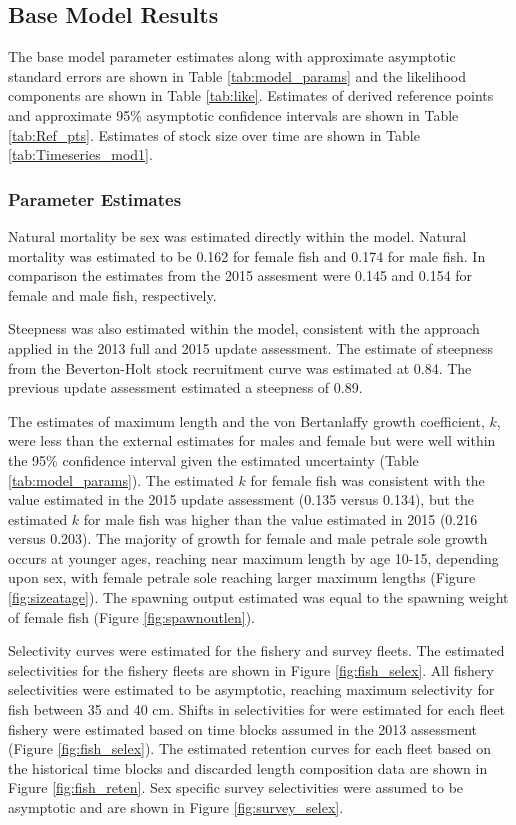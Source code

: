 \documentclass[12pt,]{article}
\begin{document}
\subsection{Base Model Results}\label{base-model-results}

The base model parameter estimates along with approximate asymptotic
standard errors are shown in Table \ref{tab:model_params} and the
likelihood components are shown in Table \ref{tab:like}. Estimates of
derived reference points and approximate 95\% asymptotic confidence
intervals are shown in Table \ref{tab:Ref_pts}. Estimates of stock size
over time are shown in Table \ref{tab:Timeseries_mod1}.

\subsubsection{Parameter Estimates}\label{parameter-estimates}

Natural mortality be sex was estimated directly within the model.
Natural mortality was estimated to be 0.162 for female fish and 0.174
for male fish. In comparison the estimates from the 2015 assesment were
0.145 and 0.154 for female and male fish, respectively.

Steepness was also estimated within the model, consistent with the
approach applied in the 2013 full and 2015 update assessment. The
estimate of steepness from the Beverton-Holt stock recruitment curve was
estimated at 0.84. The previous update assessment estimated a steepness
of 0.89.

The estimates of maximum length and the von Bertanlaffy growth
coefficient, \(k\), were less than the external estimates for males and
female but were well within the 95\% confidence interval given the
estimated uncertainty (Table \ref{tab:model_params}). The estimated
\(k\) for female fish was consistent with the value estimated in the
2015 update assessment (0.135 versus 0.134), but the estimated \(k\) for
male fish was higher than the value estimated in 2015 (0.216 versus
0.203). The majority of growth for female and male petrale sole growth
occurs at younger ages, reaching near maximum length by age 10-15,
depending upon sex, with female petrale sole reaching larger maximum
lengths (Figure \ref{fig:sizeatage}). The spawning output estimated was
equal to the spawning weight of female fish (Figure
\ref{fig:spawnoutlen}).

Selectivity curves were estimated for the fishery and survey fleets. The
estimated selectivities for the fishery fleets are shown in Figure
\ref{fig:fish_selex}. All fishery selectivities were estimated to be
asymptotic, reaching maximum selectivity for fish between 35 and 40 cm.
Shifts in selectivities for were estimated for each fleet fishery were
estimated based on time blocks assumed in the 2013 assessment (Figure
\ref{fig:fish_selex}). The estimated retention curves for each fleet
based on the historical time blocks and discarded length composition
data are shown in Figure \ref{fig:fish_reten}. Sex specific survey
selectivities were assumed to be asymptotic and are shown in Figure
\ref{fig:survey_selex}.
\end{document}
